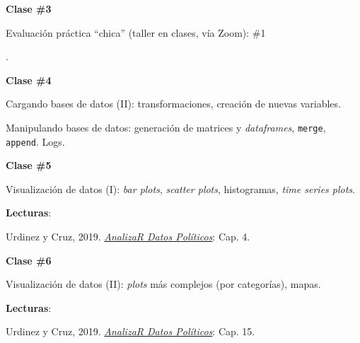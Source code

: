 \documentclass[letterpaper]{article}
\renewenvironment{itemize}{
  \begin{list}{}{
    \setlength{\leftmargin}{1.5em}
  }
}{
  \end{list}
}
\begin{document}
\begin{enumerate}
			\begin{itemize} 
				\item[$\bullet$] {\bf Clase \#3}
					\begin{itemize} 
						{\color{red}\item[\Pointinghand] Evaluaci\'on pr\'actica ``chica'' (taller en clases, v\'ia Zoom): \#1}.
					\end{itemize}
			\end{itemize}



			\begin{itemize} 
				\item[$\bullet$] {\bf Clase \#4}
					\begin{itemize} 
				\item[$\circ$] Cargando bases de datos (II): transformaciones, creaci\'on de nuevas variables.
				\item[$\circ$] Manipulando bases de datos: generaci\'on de matrices y \emph{dataframes}, \texttt{merge}, \texttt{append}. Logs.  %
					\end{itemize}
			\end{itemize}




			\begin{itemize} 
				\item[$\bullet$] {\bf Clase \#5}
					\begin{itemize} 
						\item[$\circ$] Visualizaci\'on de datos (I): \emph{bar plots}, \emph{scatter plots}, histogramas, \emph{time series plots}. %
						\item[$\circ$] {\bf Lecturas}:
							\begin{itemize}
								\item[$\diamond$] Urdinez y Cruz, 2019. \href{https://arcruz0.github.io/libroadp/index.html}{\emph{AnalizaR Datos Políticos}}: Cap. 4.
							\end{itemize}
					\end{itemize}
			\end{itemize}



			\begin{itemize} 
				\item[$\bullet$] {\bf Clase \#6}
					\begin{itemize} 
				\item[$\circ$] Visualizaci\'on de datos (II): \emph{plots} m\'as complejos (por categor\'ias), mapas.
				\item[$\circ$] {\bf Lecturas}: 
					\begin{itemize}
						\item[$\diamond$] Urdinez y Cruz, 2019. \href{https://arcruz0.github.io/libroadp/index.html}{\emph{AnalizaR Datos Políticos}}: Cap. 15.
					\end{itemize}
					\end{itemize}
			\end{itemize}



\end{enumerate}
\end{document}
